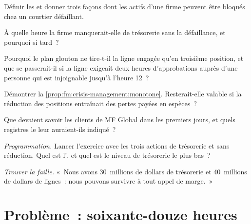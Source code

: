 \begin{exercise}[$\star$]\label{exo:fm:crisis-management:2}
Définir les  et donner trois façons dont les actifs d'une firme peuvent être bloqués chez un courtier défaillant.
\end{exercise}

\begin{exercise}[$\star$]\label{exo:fm:crisis-management:3}
À quelle heure la firme manquerait-elle de trésorerie sans la défaillance, et pourquoi si tard~?
\end{exercise}

\begin{exercise}[$\star\star$]\label{exo:fm:crisis-management:4}
Pourquoi le plan glouton ne tire-t-il la ligne engagée qu'en troisième position, et que se passerait-il si la ligne exigeait deux heures d'approbations auprès d'une personne qui est
injoignable jusqu'à l'heure 12~?
\end{exercise}

\begin{exercise}[$\star\star$]\label{exo:fm:crisis-management:5}
Démontrer la \cref{prop:fm:crisis-management:monotone}. Resterait-elle valable si la réduction des positions entraînait des pertes payées en espèces~?
\end{exercise}

\begin{exercise}[$\star\star$]\label{exo:fm:crisis-management:6}
Que devaient savoir les clients de MF Global dans les premiers jours, et quels registres le leur auraient-ils indiqué~?
\end{exercise}

\begin{exercise}[$\star\star\star$]\label{exo:fm:crisis-management:7}
\emph{Programmation.} Lancer l'exercice avec les trois actions de trésorerie et sans réduction. Quel est l', et quel est le niveau de trésorerie le plus bas~?
\end{exercise}

\begin{exercise}[$\star\star\star$]\label{exo:fm:crisis-management:8}
\emph{Trouver la faille.} «~Nous avons 30~millions de dollars de trésorerie et 40~millions de dollars de lignes~: nous pouvons survivre à tout appel de marge.~»
\end{exercise}

\section{Problème~: soixante-douze heures}

